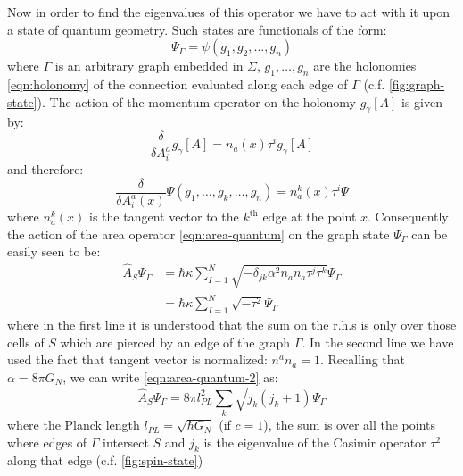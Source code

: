 \documentclass[submission, Phys]{SciPost}
\begin{document}
Now in order to find the eigenvalues of this operator we have to act with it upon a state of quantum geometry. Such states are functionals of the form:
\begin{equation}\label{eqn:graph-state}
	\Psi_\Gamma = \psi(g_1,g_2,\ldots,g_n)
\end{equation}
where $ \Gamma $ is an arbitrary graph embedded in $ \Sigma $, $ g_1,\ldots,g_n $ are the holonomies \eqref{eqn:holonomy} of the connection evaluated along each edge of $ \Gamma $ (c.f. \autoref{fig:graph-state}). The action of the momentum operator on the holonomy $ g_\gamma[A] $ is given by:
\begin{equation}\label{eqn:edge-momentum}
	\frac{\delta}{\delta A^a_i} g_\gamma[A] = n_a (x) \tau^i g_\gamma[A]
\end{equation}
and therefore:
\begin{equation}\label{eqn:graph-momentum}
	\frac{\delta}{\delta A^a_i(x)} \Psi(g_1,\ldots,g_k,\ldots,g_n) = n_a^k(x) \tau^i \Psi
\end{equation}
where $ n_a^k(x) $ is the tangent vector to the $ k^\text{th} $ edge at the point $ x $. Consequently the action of the area operator \eqref{eqn:area-quantum} on the graph state $ \Psi_\Gamma $ can be easily seen to be:
\begin{align}\label{eqn:area-quantum-2}
	\hat A_S \Psi_\Gamma & = \hbar \kappa \sum_{I=1}^N \sqrt{-\delta_{jk} \alpha^2 n_a n_a \tau^j \tau^k } \Psi_\Gamma \nonumber \\
	& = \hbar \kappa \sum_{I=1}^N \sqrt{- \tau^2} \Psi_\Gamma
\end{align}
where in the first line it is understood that the sum on the r.h.s is only over those cells of $ S $ which are pierced by an edge of the graph $ \Gamma $. In the second line we have used the fact that tangent vector is normalized: $ n^a n_a = 1 $. Recalling that $ \alpha = 8 \pi G_N $, we can write \eqref{eqn:area-quantum-2} as:
\begin{equation}\label{eqn:area-quantum-3}
	\hat A_S \Psi_\Gamma = 8 \pi l_{PL}^2 \sum_k \sqrt{ j_k (j_k + 1)} \Psi_\Gamma
\end{equation}
where the Planck length $ l_{PL} = \sqrt{\hbar G_N} $ (if $ c = 1 $), the sum is over all the points where edges of $ \Gamma $ intersect $ S $ and $ j_k $ is the eigenvalue of the Casimir operator $ \tau^2 $ along that edge (c.f. \autoref{fig:spin-state})
\end{document}
